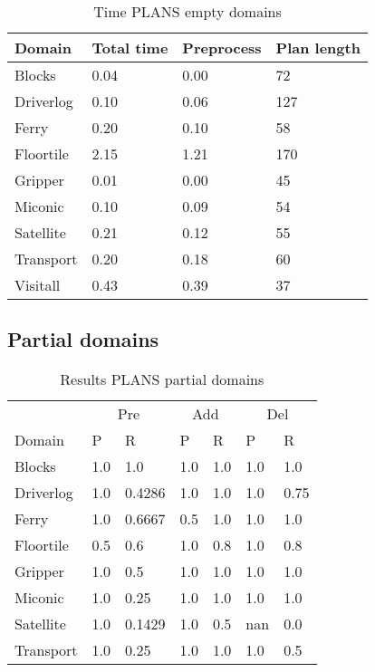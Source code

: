 \documentclass[]{article}
\begin{document}
\begin{table}[H]
	\caption{Time PLANS empty domains}
	\label{tab:time_plans_empty}
	\begin{center}
		\begin{tabular}{l|l|l|l|}			 
			Domain & Total time & Preprocess & Plan length  \\
			\hline
			Blocks & 0.04 & 0.00 & 72  \\
			Driverlog & 0.10 & 0.06 & 127 \\
			Ferry & 0.20 & 0.10 & 58 \\
			Floortile & 2.15 & 1.21 & 170 \\
			Gripper & 0.01 & 0.00 & 45 \\
			Miconic & 0.10 & 0.09 & 54  \\
			Satellite & 0.21 & 0.12 & 55 \\
			Transport & 0.20 & 0.18 & 60 \\
			Visitall & 0.43 & 0.39 & 37 \\
		\end{tabular}
	\end{center}	
\end{table}

\subsection{Partial domains}

\begin{table}[H]
	\caption{Results PLANS partial domains}
	\label{tab:results_plans_partial}
	\begin{center}
		\begin{tabular}{l|l|l|l|l|l|l|}
			& \multicolumn{2}{|c|}{Pre} & \multicolumn{2}{|c|}{Add} & \multicolumn{2}{|c|}{Del}  \\ \cline{2-7}			 
			Domain & P & R & P & R & P & R \\
			\hline
			Blocks & 1.0 & 1.0 & 1.0 & 1.0 & 1.0 & 1.0 \\
			Driverlog & 1.0 & 0.4286 & 1.0 & 1.0 & 1.0 & 0.75 \\
			Ferry & 1.0 & 0.6667 & 0.5 & 1.0 & 1.0 & 1.0 \\
			Floortile & 0.5 & 0.6 & 1.0 & 0.8 & 1.0 & 0.8 \\
			Gripper & 1.0 & 0.5 & 1.0 & 1.0 & 1.0 & 1.0 \\
			Miconic & 1.0 & 0.25 & 1.0 & 1.0 & 1.0 & 1.0 \\
			Satellite & 1.0 & 0.1429 & 1.0 & 0.5 & nan & 0.0 \\
			Transport & 1.0 & 0.25 & 1.0 & 1.0 & 1.0 & 0.5 \\
		\end{tabular}
	\end{center}	
\end{table}
\end{document}
